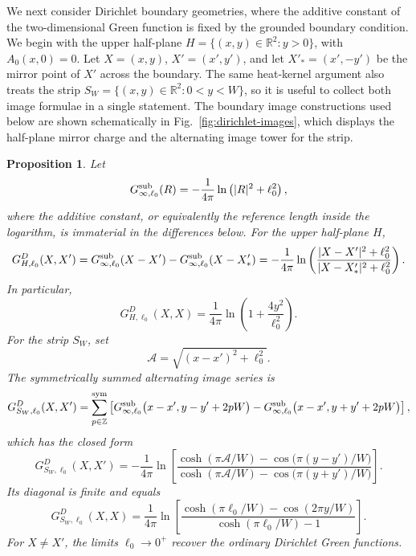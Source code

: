 \documentclass[openacc]{rsproca_new}%
\newtheorem{proposition}{\bf Proposition}[section]
\begin{document}
We next consider Dirichlet boundary geometries, where the additive constant of the two-dimensional Green function is fixed by the grounded boundary condition. We begin with the upper half-plane
\(H=\{(x,y)\in\mathbb R^2:y>0\}\), with \(A_0(x,0)=0\). Let \(X=(x,y)\), \(X'=(x',y')\), and let \(X'_*=(x',-y')\) be the mirror point of \(X'\) across the boundary. The same heat-kernel argument also treats the strip \(S_W=\{(x,y)\in\mathbb R^2:0<y<W\}\), so it is useful to collect both image formulae in a single statement. The boundary image constructions used below are shown schematically in Fig.~\ref{fig:dirichlet-images}, which displays the half-plane mirror charge and the alternating image tower for the strip. 


\begin{proposition}\label{prop:dirichlet-images}
Let
\begin{equation}
  G_{\infty,\ell_0}^{\rm sub}(R)=-\frac{1}{4\pi}\ln\left(|R|^2+\ell_0^2\right),
\end{equation}
where the additive constant, or equivalently the reference length inside the logarithm, is immaterial in the differences below. For the upper half-plane \(H\),
\begin{equation}\label{GD}
  G_{H,\ell_0}^D(X,X')
  =G_{\infty,\ell_0}^{\rm sub}(X-X')-G_{\infty,\ell_0}^{\rm sub}(X-X'_*)
  =-\frac{1}{4\pi}\ln\left(\frac{|X-X'|^2+\ell_0^2}{|X-X'_*|^2+\ell_0^2}\right).
\end{equation}
In particular,
\begin{equation}
  G_{H,\ell_0}^D(X,X)=\frac{1}{4\pi}\ln\left(1+\frac{4y^2}{\ell_0^2}\right).
\end{equation}
For the strip \(S_W\), set
\begin{equation}
  \mathcal A=\sqrt{(x-x')^2+\ell_0^2}.
\end{equation}
The symmetrically summed alternating image series is
\begin{equation}
  G_{S_W,\ell_0}^D(X,X')=\sum_{p\in\mathbb Z}^{\rm sym}\left[
  G_{\infty,\ell_0}^{\rm sub}\bigl(x-x',y-y'+2pW\bigr)
  -G_{\infty,\ell_0}^{\rm sub}\bigl(x-x',y+y'+2pW\bigr)
  \right],
\end{equation}
which has the closed form
\begin{equation}\label{GFs}
  G_{S_W,\ell_0}^D(X,X')=-\frac{1}{4\pi}\ln\left[
  \frac{\cosh(\pi\mathcal A/W)-\cos\bigl(\pi(y-y')/W\bigr)}
  {\cosh(\pi\mathcal A/W)-\cos\bigl(\pi(y+y')/W\bigr)}\right].
\end{equation}
Its diagonal is finite and equals
\begin{equation}
  G_{S_W,\ell_0}^D(X,X)=\frac{1}{4\pi}\ln\left[
  \frac{\cosh(\pi\ell_0/W)-\cos(2\pi y/W)}{\cosh(\pi\ell_0/W)-1}\right].
\end{equation}
For \(X\neq X'\), the limits \(\ell_0\to0^+\) recover the ordinary Dirichlet Green functions.
\end{proposition}
\end{document}
